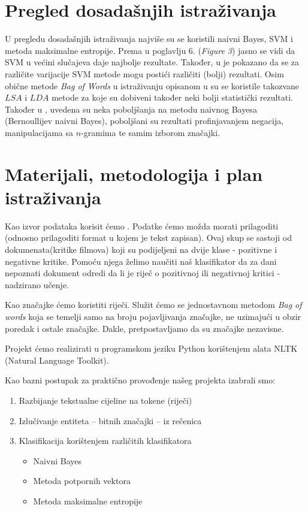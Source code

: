 \documentclass[12pt,a4paper,titlepage]{article}
\begin{document}
\section{Pregled dosadašnjih istraživanja}
U pregledu dosadašnjih istraživanja najviše su se koristili naivni Bayes, SVM i metoda maksimalne entropije. Prema \cite{Pang:2002:TUS:1118693.1118704} u poglavlju 6. (\textit{Figure 3}) jasno se vidi da SVM u većini slučajeva daje najbolje rezultate. Također, u  \cite{stan} je pokazano da se za različite varijacije SVM metode mogu postići različiti (bolji) rezultati. Osim obične metode \textit{Bag of Words} u istraživanju opisanom u \cite{maas-EtAl:2011:ACL-HLT2011} su se koristile takozvane $LSA$ i $LDA$ metode za koje su dobiveni također neki bolji statistički rezultati. Također u \cite{SaLAD:LAS}, uvedena su neka poboljšanja na metodu naivnog Bayesa (Bernoullijev naivni Bayes), poboljšani su rezultati profinjavanjem negacija, manipulacijama sa $n$-gramima te samim izborom značajki.
\section{Materijali, metodologija i plan istraživanja}

Kao izvor podataka korisit ćemo \cite{dataset}. Podatke ćemo možda morati prilagoditi (odnosno prilagoditi format u kojem je tekst zapisan). Ovaj skup se sastoji od dokumenata(kritike filmova) koji su podijeljeni na dvije klase - pozitivne i negativne kritike. Pomoću njega želimo naučiti naš klasifikator da za dani nepoznati dokument odredi da li je riječ o pozitivnoj ili negativnoj kritici - nadzirano učenje.

Kao značajke ćemo koristiti riječi. Služit ćemo se jednostavnom metodom \textit{Bag of words} koja se temelji samo na broju pojavljivanja značajke, ne uzimajući u obzir poredak i ostale značajke. Dakle, pretpostavljamo da su značajke nezavisne.

Projekt ćemo realizirati u programskom jeziku Python korištenjem alata NLTK (Natural Language Toolkit). 

Kao bazni postupak za praktično provođenje našeg projekta izabrali smo:

\begin{enumerate}
	\item Razbijanje tekstualne cijeline na tokene (riječi)
	\item Izlučivanje entiteta -- bitnih značajki -- iz rečenica
	\item Klasifikacija korištenjem različitih klasifikatora
	\begin{itemize}
		\item Naivni Bayes
		\item Metoda potpornih vektora
		\item Metoda maksimalne entropije
	\end{itemize}
\end{enumerate}
\end{document}
